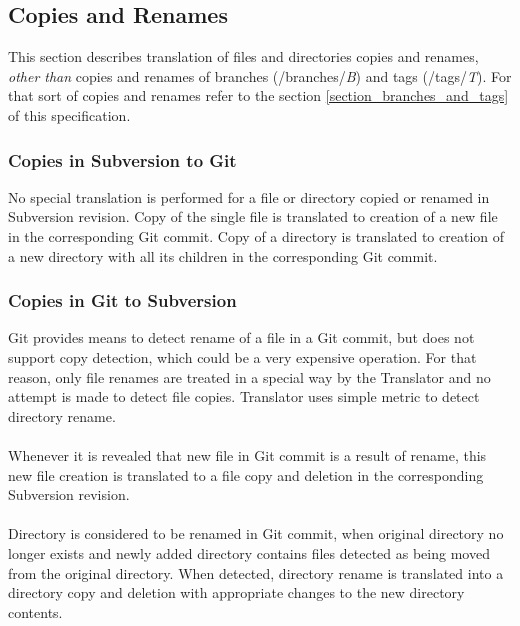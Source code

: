 \subsection{Copies and Renames}
This section describes translation of files and directories copies and renames, \emph{other than} copies and renames of 
branches (/branches/\emph{B}) and tags (/tags/\emph{T}). For that sort of copies and renames refer to the section \ref{section_branches_and_tags} of this specification.

\subsubsection{Copies in Subversion to Git}
No special translation is performed for a file or directory copied or renamed in Subversion revision. Copy of the single file is translated 
to creation of a new file in the corresponding Git commit. Copy of a directory is translated to creation of a new directory with all its children
in the corresponding Git commit.

\subsubsection{Copies in Git to Subversion}
Git provides means to detect rename of a file in a Git commit, but does not support copy detection, which could be 
a very expensive operation. For that reason, only file renames are treated in a special way by the Translator and
no attempt is made to detect file copies. Translator uses simple metric to detect directory rename.\\\\
Whenever it is revealed that new file in Git commit is a result of rename, this new file creation is translated to a file copy and deletion in the 
corresponding Subversion revision.\\\\ 
Directory is considered to be renamed in Git commit, when original directory no longer exists and newly added directory contains
files detected as being moved from the original directory. When detected, directory rename is translated into a directory copy
and deletion with appropriate changes to the new directory contents.
